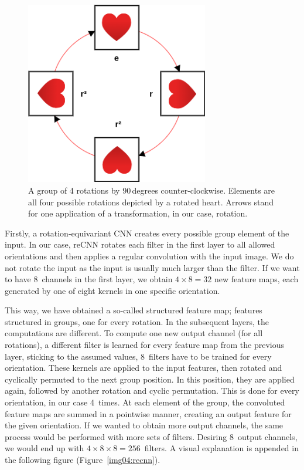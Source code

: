 \begin{figure}[h]\centering
	\includegraphics[width=80mm]{../img/group.png}
	\caption{A group of 4 rotations by 90\,degrees counter-clockwise. Elements are all four possible rotations depicted by a rotated heart. Arrows stand for one application of a transformation, in our case, rotation.}
	\label{img03:group}
\end{figure}

Firstly, a rotation-equivariant CNN creates every possible group element of the input. In our case, reCNN rotates each filter in the first layer to all allowed orientations and then applies a regular convolution with the input image. We do not rotate the input as the input is usually much larger than the filter. If we want to have 8~channels in the first layer, we obtain $4\times8 = 32$ new feature maps, each generated by one of eight kernels in one specific orientation.

This way, we have obtained a so-called structured feature map; features structured in groups, one for every rotation. In the subsequent layers, the computations are different. To compute one new output channel (for all rotations), a different filter is learned for every feature map from the previous layer, sticking to the assumed values, 8~filters have to be trained for every orientation. These kernels are applied to the input features, then rotated and cyclically permuted to the next group position. In this position, they are applied again, followed by another rotation and cyclic permutation. This is done for every orientation, in our case 4~times. At each element of the group, the convoluted feature maps are summed in a pointwise manner, creating an output feature for the given orientation. If we wanted to obtain more output channels, the same process would be performed with more sets of filters. Desiring 8~output channels, we would end up with $4\times8\times8 = 256$~filters. A visual explanation is appended in the following figure (Figure~\ref{img04:recnn}).

